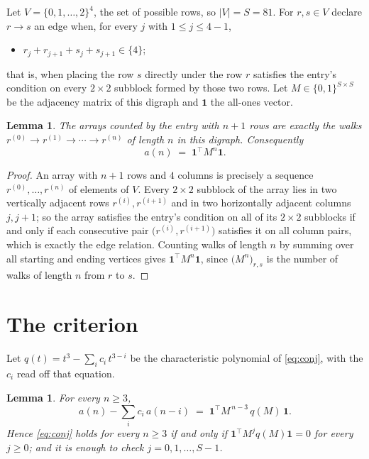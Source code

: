 \documentclass[11pt,a4paper]{article}
\theoremstyle{plain}
\newtheorem{lemma}[theorem]{Lemma}
\theoremstyle{definition}
\begin{document}
Let $V=\{0,1,\dots,2\}^{4}$, the set of possible rows, so $|V|=S=81$. For
$r,s\in V$ declare $r\to s$ an edge when, for every $j$ with $1\le j\le 4-1$,
\begin{itemize}
\item $r_j+r_{j+1}+s_j+s_{j+1}\in\{4\}$;

\end{itemize}
that is, when placing the row $s$ directly under the row $r$ satisfies the entry's
condition on every $2\times2$ subblock formed by those two rows. Let $M\in\{0,1\}^{S\times
S}$ be the adjacency matrix of this digraph and $\mathbf{1}$ the all-ones vector.

\begin{lemma}\label{lem:walk}
The arrays counted by the entry with $n+1$ rows are exactly the walks
$r^{(0)}\to r^{(1)}\to\cdots\to r^{(n)}$ of length $n$ in this digraph. Consequently
\[
a(n)\;=\;\mathbf{1}^{\!\top}M^{n}\mathbf{1} .
\]
\end{lemma}

\begin{proof}
An array with $n+1$ rows and $4$ columns is precisely a sequence
$r^{(0)},\dots,r^{(n)}$ of elements of $V$. Every $2\times2$ subblock of the array lies
in two vertically adjacent rows $r^{(i)},r^{(i+1)}$ and in two horizontally adjacent
columns $j,j+1$; so the array satisfies the entry's condition on all of its $2\times2$
subblocks if and only if each consecutive pair $\bigl(r^{(i)},r^{(i+1)}\bigr)$ satisfies
it on all column pairs, which is exactly the edge relation. Counting walks of length $n$ by
summing over all starting and ending vertices gives
$\mathbf{1}^{\!\top}M^{n}\mathbf{1}$, since
$\bigl(M^{n}\bigr)_{r,s}$ is the number of walks of length $n$ from $r$ to $s$.
\end{proof}

\section{The criterion}

Let $q(t)=t^{3}-\sum_{i}c_i\,t^{3-i}$ be the characteristic polynomial of
\eqref{eq:conj}, with the $c_i$ read off that equation.

\begin{lemma}\label{lem:crit}
For every $n\ge3$,
\[
a(n)-\sum_i c_i\,a(n-i)\;=\;\mathbf{1}^{\!\top}M^{\,n-3}\,q(M)\,\mathbf{1} .
\]
Hence \eqref{eq:conj} holds for every $n\ge3$ if and only if
$\mathbf{1}^{\!\top}M^{j}q(M)\mathbf{1}=0$ for every $j\ge0$; and it is enough to
check $j=0,1,\dots,S-1$.
\end{lemma}
\end{document}
